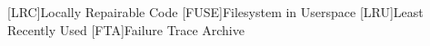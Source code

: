 \begin{acronym}
[LRC]{Locally Repairable Code}
[FUSE]{Filesystem in Userspace}
[LRU]{Least Recently Used}
[FTA]{Failure Trace Archive}
\end{acronym}
